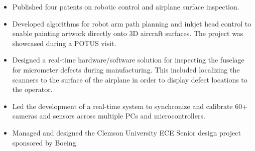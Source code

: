 \documentclass[10pt,a4paper,ragged2e,withhyper]{altacv}
\begin{document}
\begin{paracol}{2}
\begin{itemize}
\item Published four patents on robotic control and airplane surface inspection.
\item Developed algorithms for robot arm path planning and inkjet head control to enable painting artwork directly onto 3D aircraft surfaces. The project was showcased during a POTUS visit.
\item Designed a real-time hardware/software solution for inspecting the fuselage for micrometer defects during manufacturing. This included localizing the scanners to the surface of the airplane in order to display defect locations to the operator.
\item Led the development of a real-time system to synchronize and calibrate 60+ cameras and sensors across multiple PCs and microcontrollers.
\item Managed and designed the Clemson University ECE Senior design project sponsored by Boeing.
\end{itemize}





\medskip





\switchcolumn


\end{paracol}
\end{document}
